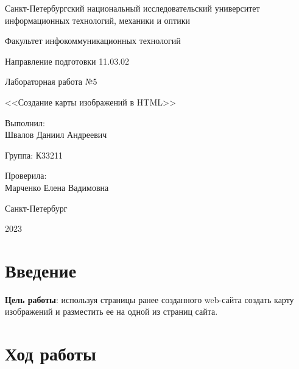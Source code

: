 \documentclass[a4paper, 14pt]{extarticle}
\begin{document}
\begin{titlepage}
  \vspace{0pt plus2fill}
  \noindent

  \vspace{0pt plus6fill}
  \begin{center}
    Санкт-Петербургский национальный исследовательский университет
    информационных технологий, механики и оптики

    \vspace{0pt plus3fill}

    Факультет инфокоммуникационных технологий

    Направление подготовки 11.03.02

    \vspace{0pt plus2fill}

    Лабораторная работа №5

    <<Создание карты изображений в HTML>>

  \end{center}

  \vspace{0pt plus9fill}
  \begin{flushright}
    Выполнил: \\
    Швалов Даниил Андреевич

    Группа: К33211

    Проверила: \\
    Марченко Елена Вадимовна
  \end{flushright}

  \vspace{0pt plus2fill}
  \begin{center}
    Санкт-Петербург

    2023
  \end{center}
\end{titlepage}

\section{Введение}

\textbf{Цель работы}: используя страницы ранее созданного web-сайта создать
карту изображений и разместить ее на одной из страниц сайта.

\section{Ход работы}
\end{document}
